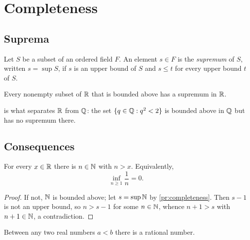 \section{Completeness}\label{sec:completeness}

\subsection{Suprema}
\begin{definition}[Supremum]\label{def:sup}
Let $S$ be a subset of an ordered field $F$. An element $s\in F$ is the
\emph{supremum} of $S$, written $s=\sup S$, if $s$ is an upper bound of $S$
and $s\le t$ for every upper bound $t$ of $S$.
\end{definition}

\begin{principle}\label{pr:completeness}
Every nonempty subset of $\mathbb{R}$ that is bounded above has a supremum in $\mathbb{R}$.
\end{principle}

\begin{remark}
 is what separates $\mathbb{R}$ from $\Q$: the set
$\{q\in\mathbb{Q} : q^2<2\}$ is bounded above in $\Q$ but has no supremum there.
\end{remark}

\subsection{Consequences}
\begin{theorem}\label{thm:archimedean}
For every $x\in\mathbb{R}$ there is $n\in\mathbb{N}$ with $n>x$. Equivalently,
\begin{equation}\label{eq:archimedean}
  \inf_{n\ge 1}\frac1n = 0.
\end{equation}
\end{theorem}

\begin{proof}
If not, $\mathbb{N}$ is bounded above; let $s=\sup\mathbb{N}$ by \cref{pr:completeness}.
Then $s-1$ is not an upper bound, so $n>s-1$ for some $n\in\mathbb{N}$, whence
$n+1>s$ with $n+1\in\mathbb{N}$, a contradiction.
\end{proof}

\begin{corollary}[Density of $\Q$]\label{cor:density}
Between any two real numbers $a<b$ there is a rational number.
\end{corollary}

